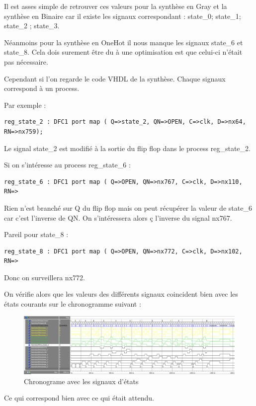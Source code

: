 \documentclass{article}
\newcommand{\sautligne}{
\textbf{\vspace{5mm}}
}
\begin{document}
\begin{landscape}
\begin{figure}[!h]
\end{figure} 

Il est asses simple de retrouver ces valeurs pour la synthèse en Gray et la synthèse en Binaire car il existe les signaux correspondant : state\_0; state\_1; state\_2 ; state\_3.

Néanmoins pour la synthèse en OneHot il nous manque les signaux state\_6 et state\_8. Cela dois surement être du à une optimisation est que celui-ci n'était pas nécessaire. 

Cependant si l'on regarde le code VHDL de la synthèse. Chaque signaux correspond à un process. 

Par exemple : 

\begin{verbatim}
reg_state_2 : DFC1 port map ( Q=>state_2, QN=>OPEN, C=>clk, D=>nx64, RN=>nx759);
\end{verbatim}

Le signal state\_2 est modifié à la sortie du flip flop dans le process reg\_state\_2.

Si on s'intéresse au process reg\_state\_6 : 

\begin{verbatim}
reg_state_6 : DFC1 port map ( Q=>OPEN, QN=>nx767, C=>clk, D=>nx110, RN=>
\end{verbatim}

Rien n'est branché sur Q du flip flop mais on peut récupérer la valeur de state\_6 car c'est l'inverse de QN. On s'intéressera alors ç l'inverse du signal nx767.
\sautligne

Pareil pour state\_8 :
\begin{verbatim}
reg_state_8 : DFC1 port map ( Q=>OPEN, QN=>nx772, C=>clk, D=>nx102, RN=>
\end{verbatim}

Donc on surveillera nx772.

On vérifie alors que les valeurs des différents signaux coincident bien avec les états courants sur le chronogramme suivant :

\begin{figure}[!h]
\centering
\includegraphics[scale=0.6]{C/CLEAN.PNG}
\caption{Chronograme avec les signaux d'états }
\end{figure} 

Ce qui correspond bien avec ce qui était attendu.

\end{landscape}
\end{document}
